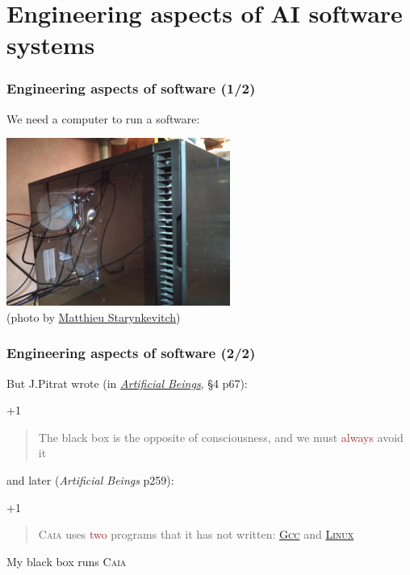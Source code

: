 \documentclass[xcolor=svgnames,final,smaller,a4]{beamer}
\begin{document}
 \section{Engineering aspects of AI software systems}
 \label{sec:engineering-ai}
 
 \begin{frame}
   \frametitle{Engineering aspects of software (1/2)}

   We need a computer to run a software:

   \begin{center}
     \includegraphics[width=0.55\textwidth]{black-box-computer-small}\\
     (photo by \href{http://matthieu-starynkevitch.com/}{Matthieu Starynkevitch})
   \end{center}

 \end{frame}

 \begin{frame}
   \frametitle{Engineering aspects of software (2/2)}
 
   But J.Pitrat wrote (in \href{https://onlinelibrary.wiley.com/doi/book/10.1002/9780470611791}{\textit{Artificial Beings}}, §4 p67):
   
   \begin{relsize}{+1}
   \begin{quote}
     The black box is the opposite of consciousness, and we must \textcolor{brown}{always} avoid it
   \end{quote}
   \end{relsize}
   
   and later (\textit{Artificial Beings} p259):

   \begin{relsize}{+1}
   \begin{quote}
       \textsc{Caia} uses \textcolor{brown}{two} programs that it has not written: \href{http://gcc.gnu.org/}{\textsc{Gcc}} and \href{https://https://en.wikipedia.org/wiki/Linux}{\textsc{Linux}}
     \end{quote}
   \end{relsize}
   
   {}

   \bigskip
   
   My black box runs \textsc{Caia} {\large \smiley{}}
 \end{frame}
\end{document}
